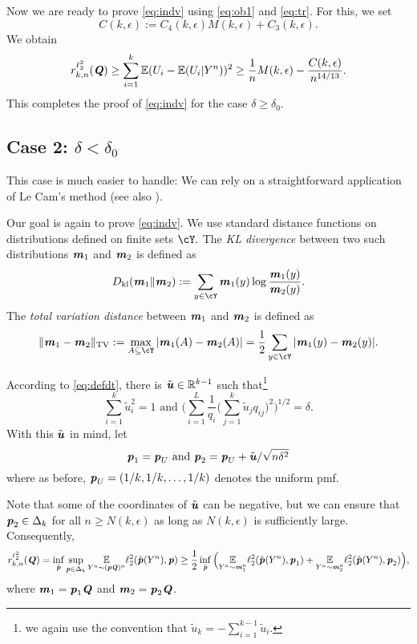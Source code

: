 \documentclass[11pt,onecolumn]{IEEEtran}
\def\mathbi#1{{\textbf{\textit #1}}}
\DeclareMathOperator{\TV}{TV}
\DeclareMathOperator{\kl}{kl}
\begin{document}
Now we are ready to prove \eqref{eq:indv} using \eqref{eq:ob1} and \eqref{eq:tr}. For this, we set 
$$
C(k,\epsilon) :=
C_4(k,\epsilon) M(k,\epsilon)
+ C_3(k,\epsilon).
$$
We obtain
$$
r_{k,n}^{\ell_2^2}(\mathbi{Q}) 
\ge  \sum_{i=1}^k \mathbb{E}  (U_i- \mathbb{E} (U_i | Y^n ) )^2  \ge
\frac 1n M(k,\epsilon)
 - \frac{C(k,\epsilon)} {n^{14/13} }.
$$
This completes the proof of \eqref{eq:indv} for the case $\delta \ge \delta_0$.


\subsection{\bf Case 2: $\delta < \delta_0$}

This case is much easier to handle: We can rely on a straightforward application of Le Cam's method \cite{LeCam12} (see also 
\cite[Lemma 1]{Yu97}). 
 
Our goal is again to prove \eqref{eq:indv}. We use standard distance functions on distributions defined on finite sets $\cY.$ The {\em KL divergence} between
two such distributions $\mathbi{m}_1$ and $\mathbi{m}_2$ is defined as
$$
D_{\kl}(\mathbi{m}_1 \| \mathbi{m}_2) := \sum_{y\in\cY}  \mathbi{m}_1(y) \log \frac{\mathbi{m}_1(y)}
{\mathbi{m}_2(y)}.
$$
The {\em total variation distance} between $\mathbi{m}_1$ and $\mathbi{m}_2$ is defined as
\begin{equation}\label{eq:deftv}
\| \mathbi{m}_1 - \mathbi{m}_2 \|_{\TV} := \max_{A\subseteq \cY} |\mathbi{m}_1(A) - \mathbi{m}_2(A)|
=\frac{1}{2}\sum_{y\in\cY} |\mathbi{m}_1(y) - \mathbi{m}_2(y)|.
\end{equation}

According to \eqref{eq:defdt}, there is $\tilde{\mathbi{u}} \in\mathbb{R}^{k-1}$ such that\footnote{we again use the convention that
$\tilde{u}_k = -\sum_{i=1}^{k-1} \tilde{u}_i$.}
\begin{equation}\label{eq:tud}
\sum_{i=1}^k \tilde{u}_i^2=1 \text{~and~}
\Big(\sum_{i=1}^L \frac{1}{q_i} \Big(\sum_{j=1}^k \tilde{u}_j q_{ij} \Big)^2\Big)^{1/2} = \delta.
\end{equation}
With this $\tilde{\mathbi{u}}$ in mind, let
  $$
\mathbi{p}_1 = \mathbi{p}_U \text{~and~}
\mathbi{p}_2 = \mathbi{p}_U + \tilde{\mathbi{u}}/\sqrt{n \delta^2}
  $$
where as before, $\mathbi{p}_U=(1/k,1/k,\dots,1/k)$ denotes the uniform pmf.

Note that some of the coordinates of $\tilde{\mathbi{u}}$ can be negative, but we can ensure that
$\mathbi{p}_2 \in \Delta_k$ for all $n\ge N(k,\epsilon)$ as long as $N(k,\epsilon)$ is sufficiently large. Consequently,
$$
r_{k,n}^{\ell_2^2} (\mathbi{Q}) = \inf_{\hat{\mathbi{p}}} \sup_{\mathbi{p}\in \Delta_k} 
\underset{Y^n\sim (\mathbi{p} \mathbi{Q})^n}{\mathbb{E}} \ell_2^2(\hat{\mathbi{p}}(Y^n), \mathbi{p})
\ge \frac{1}{2} \inf_{\hat{\mathbi{p}}}
\Big( \underset{Y^n\sim \mathbi{m}_1^n}{\mathbb{E}} \ell_2^2(\hat{\mathbi{p}}(Y^n), \mathbi{p}_1) +
\underset{Y^n\sim \mathbi{m}_2^n}{\mathbb{E}} \ell_2^2(\hat{\mathbi{p}}(Y^n), \mathbi{p}_2 ) \Big),
$$
where $\mathbi{m}_1=\mathbi{p}_1 \mathbi{Q}$ and 
$\mathbi{m}_2 = \mathbi{p}_2 \mathbi{Q}$.
\end{document}
